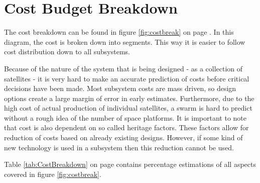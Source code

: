 
\section{Cost Budget Breakdown}
\label{blBudgetCost}
The cost breakdown can be found in figure \ref{fig:costbreak} on page \pageref{fig:costbreak}. In this diagram, the cost is broken down into segments. This way it is easier to follow cost distribution down to all subsystems.

Because of the nature of the system that is being designed - as a collection of satellites - it is very hard to make an accurate prediction of costs before critical decisions have been made. Most subsystem costs are mass driven, so design options create a large margin of error in early estimates. Furthermore, due to the high cost of actual production of individual satellites, a swarm is hard to predict without a rough idea of the number of space platforms. It is important to note that cost is also dependent on so called heritage factors. These factors allow for reduction of costs based on already existing designs. However, if some kind of new technology is used in a subsystem then this reduction cannot be used.

Table \ref{tab:CostBreakdown} on page \pageref{tab:CostBreakdown} contains percentage estimations of all aspects covered in figure \ref{fig:costbreak}.


